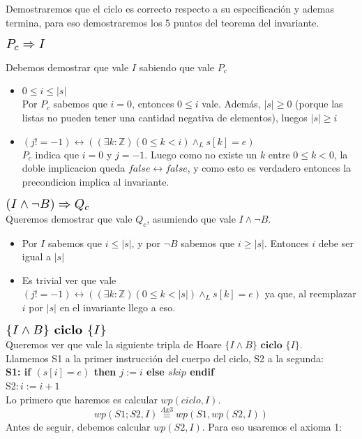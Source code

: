 \documentclass[a4paper]{article}
\begin{document}
Demostraremos que el ciclo es correcto respecto a su especificación y ademas termina, para eso demostraremos los 5 puntos del 
teorema del invariante.
	\begin{flushleft}$\scalebox{1.3}{$P_c\Rightarrow I$}$\end{flushleft}
	Debemos demostrar que vale $I$ sabiendo que vale $P_c$ 
	\begin{itemize}
		\item $ 0\leq i\leq |s|$\smallskip \\
		Por $P_c$ sabemos que $i=0$, entonces $0\leq i $ vale. Además, $|s|\geq 0$ (porque las listas no pueden tener una cantidad 
		negativa de elementos), luegos $|s|\geq i$
		\item $ (j!=-1)\leftrightarrow ((\exists k:\mathbb{Z})(0\leq k<i)\wedge_L s[k]=e)$\smallskip \\
		$P_c$ indica que $i=0$ y $j=-1$. Luego como no existe un $k$ entre $0\leq k <0$, la doble implicacion queda $false\leftrightarrow false$, y como esto es verdadero entonces la precondicion implica al invariante.
	\end{itemize}	 
	$\scalebox{1.3}{$(I\wedge \neg B)\Rightarrow Q_c$}$\smallskip \\
	Queremos demostrar que vale $Q_c$, asumiendo que vale  $I\wedge \neg B$.
	\begin{itemize}
	\item Por $I$ sabemos que $i\leq |s|$, y por $\neg B$ sabemos que $i\geq |s|$. Entonces $i$ debe ser igual a $|s|$
	\item Es trivial ver que vale $ (j!=-1)\leftrightarrow ((\exists k:\mathbb{Z})(0\leq k<|s|)\wedge_L s[k]=e)$ ya que, al reemplazar
	 $i$ por $|s|$ en el invariante llego a eso.
	\end{itemize}
	$\scalebox{1.3}{$\{I\wedge B\} \textbf{ ciclo } \{I\}$}$\medskip \\
	Queremos ver que vale la siguiente tripla de Hoare $\{I\wedge B\} \textbf{ ciclo } \{I\}$.\\
	Llamemos S1 a la primer instrucción del cuerpo del ciclo, S2 a la segunda:\\
	\textbf{S1: if $(s[i]=e)$ then $j:=i$ else $skip$ endif}\\
	S2$: i:=i+1$\\
	Lo primero que haremos es calcular $wp(ciclo,I)$.
	\begin{equation}wp(S1;S2,I)\stackrel{Ax3}{\equiv}wp(S1,wp(S2,I))\end{equation}
	Antes de seguir, debemos calcular $wp(S2,I)$. Para eso usaremos el axioma 1:
\end{document}

